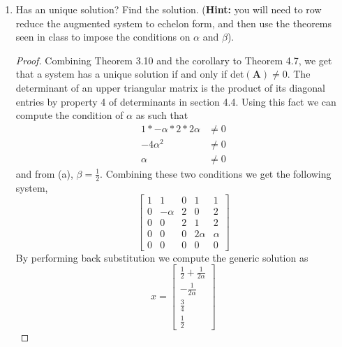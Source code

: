 \documentclass[11pt]{scrartcl}
\begin{document}
\begin{enumerate}[label=\alph*.]
{\begin{proof}
		      Thus this system will have no solution if $2\beta - 1 \neq 0$, which is when $\beta \neq \frac12$.
		      expain more...
	      \end{proof}
	      }
	\item{
	      Has an unique solution? Find the solution.
	      (\textbf{Hint:} you will need to row reduce the augmented system to echelon form,
	      and then use the theorems seen in class to impose the conditions on $\alpha$ and $\beta$).
	      \begin{proof}
		      Combining Theorem 3.10 and the corollary to Theorem 4.7, we get that a system has a
		      unique solution if and only if det$(\mathbf{A}) \neq 0$.
		      The determinant of an upper triangular matrix is the product of its diagonal
		      entries by property 4 of determinants in section 4.4.
		      Using this fact we can compute the condition of $\alpha$ as such that
		      \begin{align*}
			      1*-\alpha*2*2\alpha & \neq 0 \\
			      -4\alpha^2          & \neq 0 \\
			      \alpha              & \neq 0
		      \end{align*}
		      and from (a), $\beta = \frac12$. Combining these two conditions we get the following system,
		      \[
			      \left [ \begin{array}{cccc|c}
					      1 & 1        & 0 & 1       & 1      \\
					      0 & - \alpha & 2 & 0       & 2      \\
					      0 & 0        & 2 & 1       & 2      \\
					      0 & 0        & 0 & 2\alpha & \alpha \\
					      0 & 0        & 0 & 0       & 0
				      \end{array} \right ]
		      \]
		      By performing back substitution we compute the generic solution as
		      \[
			      x = \begin{bmatrix}
				      \frac12 + \frac{1}{2\alpha} \\
				      -\frac{1}{2\alpha}          \\
				      \frac34                     \\
				      \frac12
			      \end{bmatrix}
		      \]
	      \end{proof}
	      }


\end{enumerate}
\end{document}

